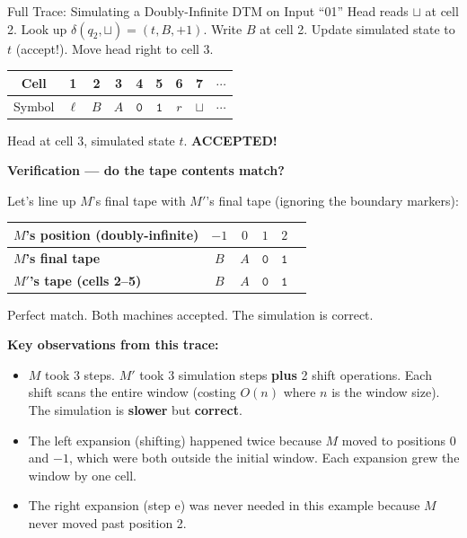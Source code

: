 \begin{examplebox}{{Full Trace: Simulating a Doubly-Infinite DTM on Input ``01''}}
Head reads $\sqcup$ at cell 2. Look up $\delta(q_2, \sqcup) = (t, B, +1)$.
Write $B$ at cell 2. Update simulated state to $t$ (accept!). Move head right
to cell 3.

\begin{center}
\begin{tabular}{c|cccccccc}
Cell & 1 & 2 & 3 & 4 & 5 & 6 & 7 & $\cdots$ \\
\hline
Symbol & $\ell$ & $B$ & $A$ & $\mathtt{0}$ & $\mathtt{1}$ & $r$ & $\sqcup$ & $\cdots$ \\
\end{tabular}
\quad Head at cell 3, simulated state $t$. \textbf{ACCEPTED!}
\end{center}

\bigskip
\textbf{Verification --- do the tape contents match?}

Let's line up $M$'s final tape with $M'$'s final tape (ignoring the boundary
markers):

\begin{center}
\renewcommand{\arraystretch}{1.3}
\begin{tabular}{l|ccccc}
\toprule
\textbf{$M$'s position (doubly-infinite)} & $-1$ & $0$ & $1$ & $2$ \\
\midrule
\textbf{$M$'s final tape} & $B$ & $A$ & $\mathtt{0}$ & $\mathtt{1}$ \\
\textbf{$M'$'s tape (cells 2--5)} & $B$ & $A$ & $\mathtt{0}$ & $\mathtt{1}$ \\
\bottomrule
\end{tabular}
\end{center}

Perfect match. Both machines accepted. The simulation is correct.

\textbf{Key observations from this trace:}
\begin{itemize}[nosep]
\item $M$ took 3 steps. $M'$ took 3 simulation steps \textbf{plus} 2 shift
  operations. Each shift scans the entire window (costing $O(n)$ where $n$
  is the window size). The simulation is \textbf{slower} but \textbf{correct}.
\item The left expansion (shifting) happened twice because $M$ moved to
  positions 0 and $-1$, which were both outside the initial window. Each
  expansion grew the window by one cell.
\item The right expansion (step e) was never needed in this example because
  $M$ never moved past position 2.
\end{itemize}
\end{examplebox}

